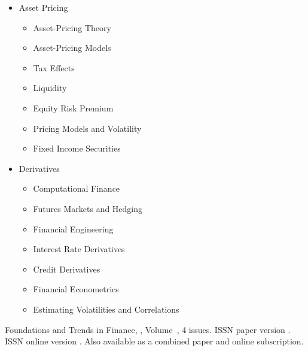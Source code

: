 {\begin{multicols}{2}
\begin{itemize}
\item{Asset Pricing}
\begin{itemize}
\item{Asset-Pricing Theory}
\item{Asset-Pricing Models}
\item{Tax Effects}
\item{Liquidity} 
\item{Equity Risk Premium} 
\item{Pricing Models and Volatility} 
\item{Fixed Income Securities} 
\end{itemize}
\end{itemize}
\columnbreak
\begin{itemize}
\item{Derivatives}
\begin{itemize}
\item{Computational Finance}
\item{Futures Markets and Hedging}
\item{Financial Engineering}
\item{Interest Rate Derivatives}
\item{Credit Derivatives}
\item{Financial Econometrics}
\item{Estimating Volatilities and Correlations}
\end{itemize}
\end{itemize}
\end{multicols}
 }

\journallibraryinfo
 {%
  Foundations and Trends\textsuperscript{\textregistered} in
  Finance, ,
  Volume~, 4 issues.
  ISSN paper version .
  ISSN online version .
  Also available as a combined paper and online
  subscription.
 } 